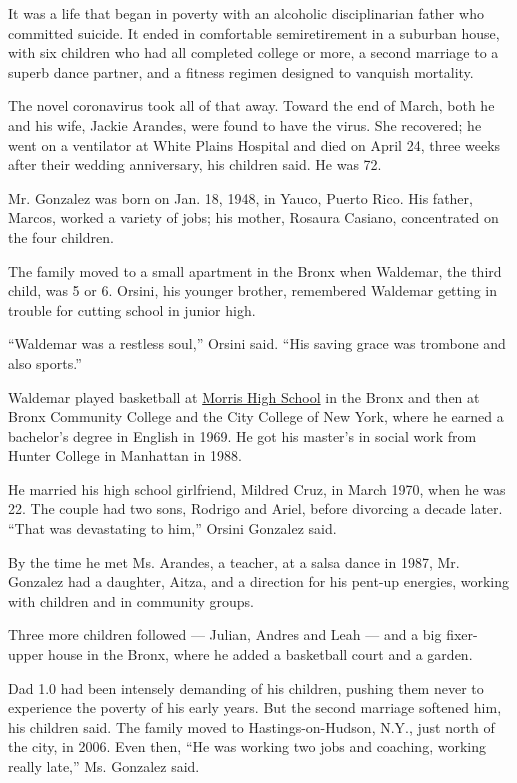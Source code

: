 It was a life that began in poverty with an alcoholic disciplinarian
father who committed suicide. It ended in comfortable semiretirement in
a suburban house, with six children who had all completed college or
more, a second marriage to a superb dance partner, and a fitness regimen
designed to vanquish mortality.

The novel coronavirus took all of that away. Toward the end of March,
both he and his wife, Jackie Arandes, were found to have the virus. She
recovered; he went on a ventilator at White Plains Hospital and died on
April 24, three weeks after their wedding anniversary, his children
said. He was 72.

Mr. Gonzalez was born on Jan. 18, 1948, in Yauco, Puerto Rico. His
father, Marcos, worked a variety of jobs; his mother, Rosaura Casiano,
concentrated on the four children.

The family moved to a small apartment in the Bronx when Waldemar, the
third child, was 5 or 6. Orsini, his younger brother, remembered
Waldemar getting in trouble for cutting school in junior high.

``Waldemar was a restless soul,'' Orsini said. ``His saving grace was
trombone and also sports.''

Waldemar played basketball at
\href{https://academicworks.cuny.edu/cgi/viewcontent.cgi?article=4054\&context=gc_etds}{Morris
High School} in the Bronx and then at Bronx Community College and the
City College of New York, where he earned a bachelor's degree in English
in 1969. He got his master's in social work from Hunter College in
Manhattan in 1988.

He married his high school girlfriend, Mildred Cruz, in March 1970, when
he was 22. The couple had two sons, Rodrigo and Ariel, before divorcing
a decade later. ``That was devastating to him,'' Orsini Gonzalez said.

By the time he met Ms. Arandes, a teacher, at a salsa dance in 1987, Mr.
Gonzalez had a daughter, Aitza, and a direction for his pent-up
energies, working with children and in community groups.

Three more children followed --- Julian, Andres and Leah --- and a big
fixer-upper house in the Bronx, where he added a basketball court and a
garden.

Dad 1.0 had been intensely demanding of his children, pushing them never
to experience the poverty of his early years. But the second marriage
softened him, his children said. The family moved to Hastings-on-Hudson,
N.Y., just north of the city, in 2006. Even then, ``He was working two
jobs and coaching, working really late,'' Ms. Gonzalez said.

